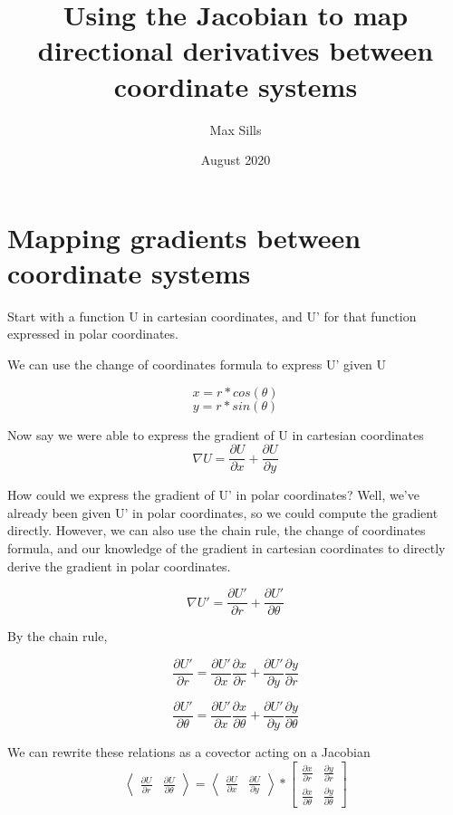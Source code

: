 \documentclass{article}
\title{Using the Jacobian to map directional derivatives between coordinate systems}
\author{Max Sills }
\date{August 2020}
\begin{document}
\maketitle

\section{Mapping gradients between coordinate systems}

Start with a function U in cartesian coordinates, and U' for that function expressed in polar coordinates.

We can use the change of coordinates formula to express U' given U


\[ x = r * cos(\theta) \]
\[ y = r * sin (\theta)\]


Now say we were able to express the gradient of U in cartesian coordinates
\[
\nabla U = \frac{\partial U} {\partial x}+
\frac{\partial U} {\partial y}
\]

How could we express the gradient of U' in polar coordinates? Well, we've already been given U' in polar coordinates, so we could compute the gradient directly. However, we can also use the chain rule, the change of coordinates formula, and our knowledge of the gradient in cartesian coordinates to directly derive the gradient in polar coordinates.

$$
\nabla U' = \frac{\partial U'} {\partial r}+
\frac{\partial U'} {\partial \theta}
$$

By the chain rule, 

$$
\frac{\partial U'} {\partial r} = \frac{\partial U'} {\partial x}\frac{\partial x} {\partial r}
+ 
\frac{\partial U'} {\partial y}\frac{\partial y} {\partial r}
$$

$$
\frac{\partial U'} {\partial \theta} = \frac{\partial U'} {\partial x}\frac{\partial x} {\partial \theta}
+ 
\frac{\partial U'} {\partial y}\frac{\partial y} {\partial \theta}
$$

We can rewrite these relations as a covector acting on a Jacobian
\begingroup
\LARGE
\begin{equation}
\left\langle
\begin{matrix}\frac{\partial U}{\partial r} & \frac{\partial U} {\partial \theta}
\end{matrix}
\right\rangle=\left\langle
\begin{matrix}\frac{\partial U}{\partial x} & \frac{\partial U} {\partial y}
\end{matrix}
\right\rangle
*
\begin{bmatrix}
\frac{\partial x}{\partial r} & \frac{\partial y}{\partial r}\\\frac{\partial x}{\partial \theta} & \frac{\partial y}{\partial \theta}
\end{bmatrix}
\end{equation}
\endgroup
\end{document}

